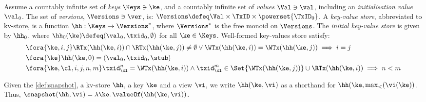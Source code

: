 \begin{definition}
\label{def:mkvs-appendix}
Assume a countably infinite set of \emph{keys} $\Keys \ni \ke$, 
and a countably infinite set of  \emph{values} $\Val \ni \val$, 
including an \emph{initialisation value} $\val_0 $.
The set of \emph{versions}, $\Versions \ni \ver$, is: $\Versions \defeq \Val \times \TxID \times \powerset{\TxID_{0}}$. 
A \emph{key-value store}, abbreviated to kv-store,  is a function $\hh: \Keys \rightarrow \Versions^{\ast}$, 
where $\Versions^{\ast}$ is the free monoid on $\Versions$. 
The \emph{initial key-value store} is given by $\hh_0$, where 
$\hh_{0}(\ke)\defeq  (\val_0, \txid_0, \emptyset)$ for
all $\ke \in \Keys$.
Well-formed key-values store satisfy:
\begin{align}
& \fora{\ke, i, j} 
\RTx(\hh(\ke, i)) \cap \RTx(\hh(\ke, j)) \neq \emptyset \lor
\WTx(\hh(\ke, i)) = \WTx(\hh(\ke, j))
\implies i = j  \\
& \fora{\ke} \hh(\ke, 0) = (\val_0, \txid_0, \stub) \\
& \fora{ \ke, \cl, i,j, n, m} 
\txid_{\cl}^{n} = \WTx(\hh(\ke,i)) \wedge \txid_{\cl}^{m} \in
\Set{\WTx(\hh(\ke,j))} \cup \RTx(\hh(\ke, i)) \implies n < m
\end{align}
\end{definition}

Given the \cref{def:snapshot}, 
a kv-store $\hh$, a key $\ke$ and a view $\vi$, 
we write $\hh(\ke, \vi)$ as a shorthand for 
$\hh(\ke, \max_{<}(\vi(\ke))$. Thus, $\snapshot(\hh, \vi) = \lambda \ke \ldotp \valueOf(\hh(\ke, \vi))$. 
